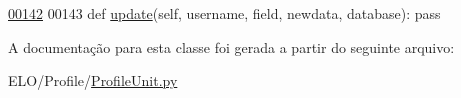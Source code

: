 \begin{DoxyCode}
\hypertarget{classProfile_1_1ProfileUnit_1_1IfPersProfile_l00142}{}\hyperlink{classProfile_1_1ProfileUnit_1_1IfPersProfile_ae2d65e1ead2780de7b97fab078bb425e}{00142} 
00143     \textcolor{keyword}{def }\hyperlink{classProfile_1_1ProfileUnit_1_1IfPersProfile_ae2d65e1ead2780de7b97fab078bb425e}{update}(self, username, field, newdata, database): \textcolor{keyword}{pass}

\end{DoxyCode}


A documentação para esta classe foi gerada a partir do seguinte arquivo\-:\begin{DoxyCompactItemize}
\item 
E\-L\-O/\-Profile/\hyperlink{ProfileUnit_8py}{Profile\-Unit.\-py}\end{DoxyCompactItemize}
